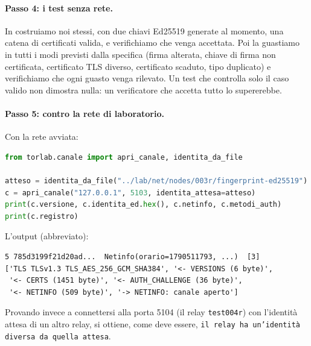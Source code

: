 \paragraph{Passo 4: i test senza rete.} In  costruiamo noi stessi, con due chiavi Ed25519 generate al momento, una catena di certificati valida, e verifichiamo che venga accettata. Poi la guastiamo in tutti i modi previsti dalla specifica (firma alterata, chiave di firma non certificata, certificato TLS diverso, certificato scaduto, tipo duplicato) e verifichiamo che ogni guasto venga rilevato. Un test che controlla solo il caso valido non dimostra nulla: un verificatore che accetta tutto lo supererebbe.

\paragraph{Passo 5: contro la rete di laboratorio.} Con la rete avviata:
\begin{lstlisting}[language=Python]
from torlab.canale import apri_canale, identita_da_file

atteso = identita_da_file("../lab/net/nodes/003r/fingerprint-ed25519")
c = apri_canale("127.0.0.1", 5103, identita_attesa=atteso)
print(c.versione, c.identita_ed.hex(), c.netinfo, c.metodi_auth)
print(c.registro)
\end{lstlisting}
L'output (abbreviato):
\begin{lstlisting}[numbers=none]
5 785d3199f21d20ad...  Netinfo(orario=1790511793, ...)  [3]
['TLS TLSv1.3 TLS_AES_256_GCM_SHA384', '<- VERSIONS (6 byte)',
 '<- CERTS (1451 byte)', '<- AUTH_CHALLENGE (36 byte)',
 '<- NETINFO (509 byte)', '-> NETINFO: canale aperto']
\end{lstlisting}
Provando invece a connettersi alla porta 5104 (il relay \texttt{test004r}) con l'identità attesa di un altro relay, si ottiene, come deve essere, \texttt{il relay ha un'identità diversa da quella attesa}.


